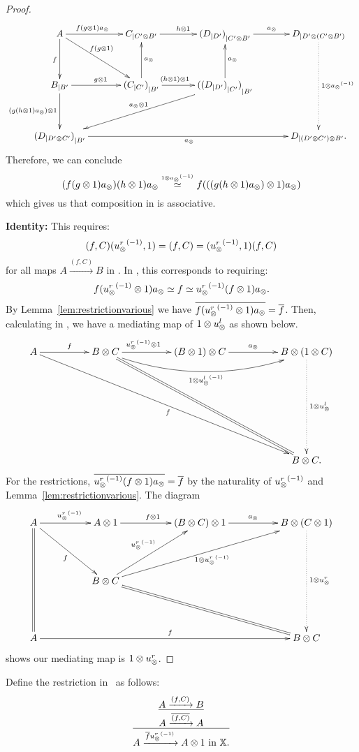 \begin{proof}
  \[
    \xymatrix @C=35pt @R=35pt{
      A \ar[d]_f \ar[r]^(.4){f (g\*1) a_{\*}} \ar[dr]^(.4){f(g\*1)} &
        \xtdmn{C}{C' \* B'} \ar[r]^{h\*1}
        & \xtdmn{(\xtdmn{D}{D'})}{C' \* B'} \ar[r]^{a_{\*}}
        & \xtdmn{D}{D' \* (C' \* B')}
        \ar@{.>}[dd]^{1\*\inv{a_{\*}}}\\
      \xtdmn{B}{B'} \ar[d]_{(g (h\*1) a_{\*})\*1} \ar[r]^{g\*1}
        &\xtdmn{(\xtdmn{C}{C'})}{B'} \ar[u]_{a_{\*}} \ar[r]^(.4){(h\*1)\*1}
        & \xtdmn{(\xtdmn{(\xtdmn{D}{D'})}{C'})}{B'}
        \ar[u]_{a_\*} \ar[dll]_{a_{\*}\*1}
      \\
      \xtdmn{(\xtdmn{D}{D' \* C'})}{B'}  \ar[rrr]_{a_{\*}}
        &&& \xtdmn{D}{(D' \* C') \* B'}. %
    }
  \]
  Therefore, we can conclude
  \[
    (f(g\otimes1)a_{\otimes}) (h\otimes1)a_{\otimes} \overset{\scriptscriptstyle 1\otimes{a_{\otimes}}^{(-1)}}{\simeq} f (((g(h\otimes1)a_{\otimes})\otimes1) a_{\otimes})
  \]
  which gives us that composition in \Xt is associative.

  \textbf{Identity:} This requires:
  \[
    (f,C) ({u_{\otimes}^r}^{(-1)}, 1) = (f,C) = ({u_{\otimes}^r}^{(-1)}, 1) (f,C)
  \]
  for all maps $A\xrightarrow{(f,C)}B$ in \Xt. In \X, this corresponds to requiring:
  \[
     f ({u_{\otimes}^r}^{(-1)}\otimes1) a_{\otimes} \overset{\scriptscriptstyle }{\simeq} f \overset{\scriptscriptstyle }{\simeq} {u_{\otimes}^r}^{(-1)} (f \otimes1)  a_{\otimes}.
  \]
  By Lemma~\ref{lem:restrictionvarious} we have
  $\overline{f ({u_{\otimes}^r}^{(-1)}\otimes1) a_{\otimes}} = \overline{f}$. Then, calculating in \X, we have a mediating map
  of $1 \otimes u_{\otimes}^l$ as shown below.
  \[
    \xymatrix @C=50pt @R=45pt{
      A \ar[r]^f \ar[ddrrr]_f&
        B \* C \ar[r]^(.4){\inv{\usr}\*1}
        \ar@/_20pt/[rr]_{1 \* \inv{\usl}}
        \ar@{=}[ddrr]
        & (B \* 1) \* C \ar[r]^{a_{\*}}
        & B \* (1 \* C) \ar@{.>}[dd]^{1 \* \usl} \\
      \\
      &&& B \* C.
    }
  \]
  For the restrictions, $\overline{{u_{\otimes}^r}^{(-1)} (f \otimes1)  a_{\otimes}} = \overline{f}$ by the naturality of
  ${u_{\otimes}^r}^{(-1)}$ and Lemma~\ref{lem:restrictionvarious}. The diagram
  \[
    \xymatrix @C=50pt @R=45pt{
      A \ar@{=}[dd] \ar[r]^{\inv{\usr}} \ar[dr]_{f}
        &      A \* 1 \ar[r]^{f \* 1}
        & (B \* C) \* 1 \ar[r]^{a_{\*}}
        & B \* (C \* 1)\ar@{.>}[dd]^{1 \* \usr} \\
      &B\*C \ar[ur]^{\inv{\usr}} \ar[urr]_{1\*\inv{\usr}} \ar@{=}[drr]\\
      A \ar[rrr]^f &&& B \* C
    }
  \]
  shows our mediating map is $1 \otimes u_{\otimes}^r$.
\end{proof}


Define the restriction in \Xt\ as follows:
\[
  \infer{A\xrightarrow{\restr{f}  \inv{u_{\*}^r}} A\*1 \text{ in }\X.}
        {\infer{A\xrightarrow{\restr{(f,C)}}A}
               {A\xrightarrow{(f,C)}B}
        }
\]

